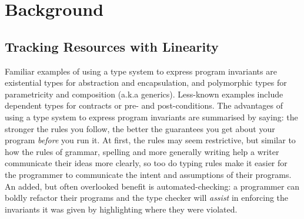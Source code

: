 \chapter{Background}

%

%

\section{Tracking Resources with Linearity} Familiar examples of using a type
system to express program invariants are existential types for abstraction and
encapsulation, and polymorphic types for parametricity and composition (a.k.a
generics). Less-known examples include dependent types for contracts or pre-
and post-conditions. The advantages of using a type system to express program
invariants are summarised by saying: the stronger the rules you follow, the
better the guarantees you get about your program \emph{before} you run it. At
first, the rules may seem restrictive, but similar to how the rules of grammar,
spelling and more generally writing help a writer communicate their ideas more
clearly, so too do typing rules make it easier for the programmer to
communicate the intent and assumptions of their programs. An added, but often
overlooked benefit is automated-checking: a programmer can boldly refactor
their programs and the type checker will \emph{assist} in enforcing the
invariants it was given by highlighting where they were violated.

